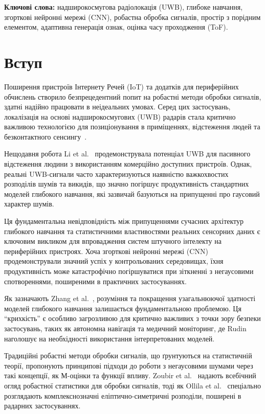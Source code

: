 \documentclass[12pt,a4paper]{article}
\begin{document}
	\textbf{Ключові слова:} надширокосмугова радіолокація (UWB), глибоке навчання, згорткові нейронні мережі (CNN), робастна обробка сигналів, простір з порідним елементом, адаптивна генерація ознак, оцінка часу проходження (ToF).
	
	\section{Вступ}
	
	Поширення пристроїв Інтернету Речей (IoT) та додатків для периферійних обчислень створило безпрецедентний попит на робастні методи обробки сигналів, здатні надійно працювати в неідеальних умовах. Серед цих застосувань, локалізація на основі надширокосмугових (UWB) радарів стала критично важливою технологією для позиціонування в приміщеннях, відстеження людей та безконтактного сенсингу~\cite{gezici2005localization}.
	
	Нещодавня робота Li et al.~\cite{li2021multi} продемонструвала потенціал UWB для пасивного відстеження людини з використанням комерційно доступних пристроїв. Однак, реальні UWB-сигнали часто характеризуються наявністю важкохвостих розподілів шумів та викидів, що значно погіршує продуктивність стандартних моделей глибокого навчання, які зазвичай базуються на припущенні про гаусовий характер шумів.
	
	Ця фундаментальна невідповідність між припущеннями сучасних архітектур глибокого навчання та статистичними властивостями реальних сенсорних даних є ключовим викликом для впровадження систем штучного інтелекту на периферійних пристроях. Хоча згорткові нейронні мережі (CNN) продемонстрували значний успіх у контрольованих середовищах, їхня продуктивність може катастрофічно погіршуватися при зіткненні з негаусовими спотвореннями, поширеними в практичних застосуваннях.
	
	Як зазначають Zhang et al.~\cite{zhang2021understanding}, розуміння та покращення узагальнюючої здатності моделей глибокого навчання залишається фундаментальною проблемою. Ця ``крихкість'' є особливо загрозливою для критично важливих з точки зору безпеки застосувань, таких як автономна навігація та медичний моніторинг, де Rudin~\cite{rudin2019stop} наголошує на необхідності використання інтерпретованих моделей.
	
	Традиційні робастні методи обробки сигналів, що ґрунтуються на статистичній теорії, пропонують принципові підходи до роботи з негаусовими шумами через такі концепції, як М-оцінки та функції впливу. Zoubir et al.~\cite{zoubir2018robust} надають всебічний огляд робастної статистики для обробки сигналів, тоді як Ollila et al.~\cite{ollila2012complex} спеціально розглядають комплекснозначні еліптично-симетричні розподіли, поширені в радарних застосуваннях. 
	
\end{document}
